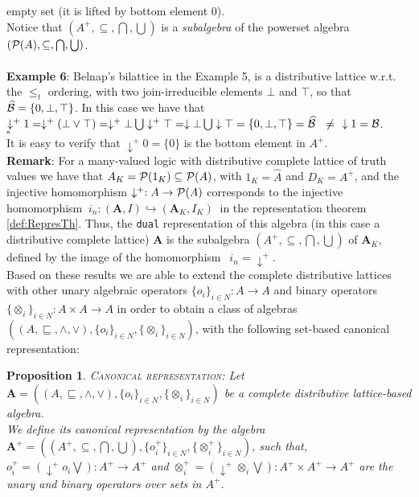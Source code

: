 \documentclass[10pt,twocolumn]{article}
\newtheorem{propo}{Proposition}
\begin{document}
empty set
(it is lifted by bottom element $0$).\\
Notice that $(A^+,\subseteq, \bigcap, \bigcup)$ is a
\emph{subalgebra} of the powerset algebra $(\P(A), \subseteq,
\bigcap, \bigcup)$.\\\\
 \textbf{Example 6}:  Belnap's bilattice in the Example 5, is a
distributive lattice w.r.t. the $\leq_t$ ordering, with two join-irreducible elements
  $\bot$ and $\top$, so that $\widehat{\B} = \{0, \bot, \top\}$.
 In this case we have that $\downarrow^+ 1 = \downarrow^+ (\bot \vee \top) =
 \downarrow^+
\bot \bigcup \downarrow^+ \top= \downarrow \bot \bigcup \downarrow
\top = \{0, \bot, \top\} = \widehat{\B} ~~\neq~~ \downarrow 1 = \B$.
\\$\square$\\
 It is easy to verify that $\downarrow^+ 0 = \{0\}$ is the bottom element
in $ A^+$.\\
\textbf{Remark}: For a many-valued logic with distributive complete
lattice of truth values we have that $A_K = \P(1_K) \subseteq
\P(A)$, with $1_K = \widehat{A}$ and $D_K = A^+$, and the injective
homomorphism $\downarrow^+:A \rightarrow \P(A)$ corresponds to the
injective homomorphism $~i_n:(\textbf{A},I)\hookrightarrow
(\textbf{A}_K,I_K)~$ in the representation theorem
\ref{def:RepresTh}. Thus, the \verb"dual" representation of this
algebra (in this case a distributive complete lattice) $\textbf{A}$
is the subalgebra
 $(A^+,\subseteq, \bigcap,\bigcup)$ of $\textbf{A}_K$, defined by the image of the homomorphism $~~i_n = \downarrow^+$.\\
 Based on these results we are able to extend the complete distributive lattices with other
 unary algebraic operators $\{o_i\}_{i \in N}:A \rightarrow A$ and binary operators $\{\otimes_i\}_{i \in N}:A\times A \rightarrow A$ in order to obtain a class of algebras
 $((A,\sqsubseteq, \wedge, \vee), \{o_i\}_{i \in N}, \{\otimes_i\}_{i \in N})$,
 with the following set-based canonical representation:
\begin{propo} \textsc{Canonical representation:} \label{prop:canonic}
 Let $ \textbf{A} =((A,\sqsubseteq, \wedge, \vee),  \{o_i\}_{i \in N}, \{\otimes_i\}_{i \in
N})$ be a complete distributive lattice-based algebra. \\ We define
its
 canonical representation by the algebra $ \textbf{A}^+ =
((A^+,\subseteq, \bigcap, \bigcup), \{o^+_i\}_{i \in N},
\{\otimes^+_i\}_{i \in N})$, such that,\\ $o^+_i = (\downarrow^+ o_i
\bigvee):A^+ \rightarrow A^+$ and $\otimes^+_i = (\downarrow^+
\otimes_i \bigvee):A^+ \times A^+ \rightarrow A^+$ are the unary and
binary  operators over sets in $A^+$.
\end{propo}
\end{document}
